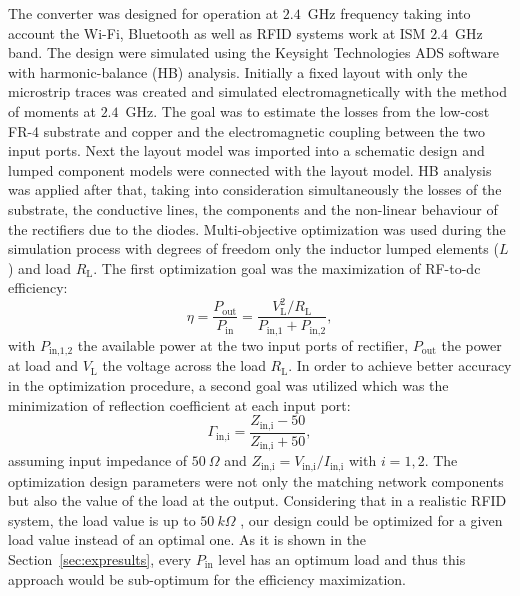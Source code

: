 \documentclass[journal]{IEEEtran}
\begin{document}
The converter was designed for operation at $2.4$~GHz frequency taking into account the  Wi-Fi, Bluetooth  as well as  RFID systems work at ISM $2.4$~GHz band.  
%
The design were simulated using the Keysight Technologies ADS software with harmonic-balance (HB) analysis.
%
Initially a fixed layout with only the microstrip traces was created and simulated electromagnetically with the method of moments at $2.4$~GHz.
%
The goal was to estimate  the losses from the low-cost FR-4 substrate and copper and the electromagnetic coupling between the two input ports. 
%
Next the layout model was imported into a schematic design and lumped component models were connected with the layout model.   
%
HB analysis was applied after that, 
taking into consideration simultaneously  the losses of the substrate, the conductive lines, the components and the non-linear behaviour of the rectifiers due to the diodes. 
%
Multi-objective optimization was used during
the simulation process with degrees of freedom only the inductor lumped elements ($L$) and load $R_\text{L}$. 
%
The first optimization goal was the maximization of  RF-to-dc efficiency: 
\begin{equation}
\eta = \frac{P_\text{out}}{P_\text{in}} = \frac{ V_\text{L}^2/R_\text{L} }{ P_\text{in,1}+P_\text{in,2} },
\end{equation}
%
with $P_\text{in,1,2}$ the available power  at the two input  ports of  rectifier, $P_\text{out}$ the power  at load and $V_\text{L}$ the voltage across the load $R_\text{L}$.  
%
In order to achieve better accuracy in the  optimization procedure,  a second goal  was utilized  which was the minimization of reflection
coefficient at each input port: 
\begin{equation}
\Gamma_\text{in,i} = \frac{Z_\text{in,i}-50}{Z_\text{in,i}+50},
\end{equation}
%
assuming input impedance of $50~\Omega$ and $Z_\text{in,i} = V_\text{in,i}/I_\text{in,i}$  with $i=1,2$.
%
The  optimization design parameters were not
only the matching network components but also the value of the load at the output. 
%
Considering that in  a realistic RFID system, the load value is up to $50~k\Omega$ \cite{pournoori2018rf}, our design could be optimized for a given load value instead of an optimal one.
%
As it is shown in the Section~\ref{sec:expresults}, every $P_\text{in}$ level has an optimum load 
and thus this approach would be sub-optimum for the efficiency maximization.
\end{document}
